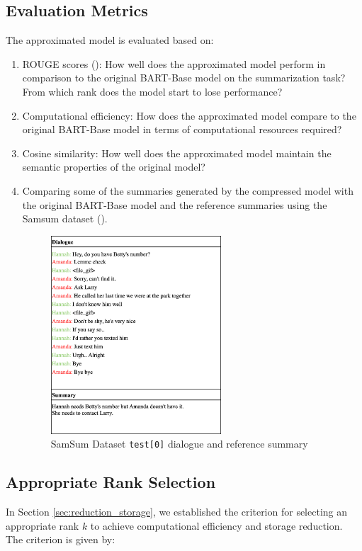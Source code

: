         
        
    \subsection{Evaluation Metrics}\label{sec:evaluation_metrics}
        The approximated model is evaluated based on:
        \begin{enumerate}
        \item ROUGE scores (\cite{lin-2004-rouge}): How well does the approximated model perform in comparison to the original BART-Base model on the summarization task? From which rank does the model start to lose performance?
        \item Computational efficiency: How does the approximated model compare to the original BART-Base model in terms of computational resources required?
        \item Cosine similarity: How well does the approximated model maintain the semantic properties of the original model?
        \item Comparing some of the summaries generated by the compressed model with the original BART-Base model and the reference summaries using the Samsum dataset (\cite{gliwa-etal-2019-samsum}).
        \begin{figure}[H]
            \centering
            \includegraphics[width=0.6\textwidth]{figs/dialogue.png}
            \caption{SamSum Dataset \texttt{test[0]} dialogue and reference summary}
            \label{fig:SamSum_Example}
        \end{figure}
        \end{enumerate}

        \subsection{Appropriate Rank Selection}
            In Section \ref{sec:reduction_storage}, we established the criterion for selecting an appropriate rank \(k\) to achieve computational efficiency and storage reduction. The criterion is given by:
            
